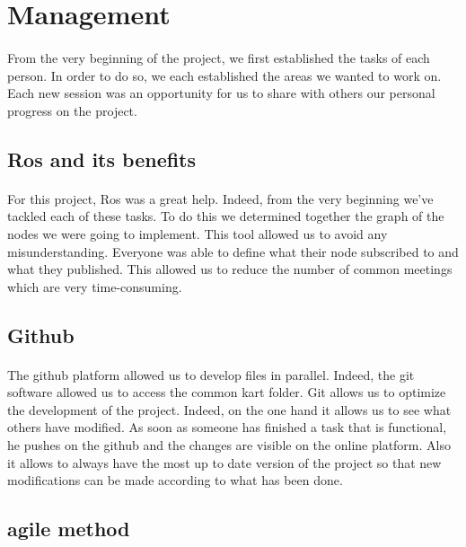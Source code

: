 
\section{Management}
\paragraph{}
From the very beginning of the project, we first established the tasks of each person. In order to do so, we each established the areas we wanted to work on.
Each new session was an opportunity for us to share with others our personal progress on the project.

\subsection{Ros and its benefits}
\paragraph{}
For this project, Ros was a great help. Indeed, from the very beginning we've tackled each of these tasks. 
To do this we determined together the graph of the nodes we were going to implement. 
This tool allowed us to avoid any misunderstanding. 
Everyone was able to define what their node subscribed to and what they published. 
This allowed us to reduce the number of common meetings which are very time-consuming.
\subsection{Github}
\paragraph{}
The github platform allowed us to develop files in parallel. 
Indeed, the git software allowed us to access the common kart folder. Git allows us to optimize the development of the project. 
Indeed, on the one hand it allows us to see what others have modified. 
As soon as someone has finished a task that is functional, he pushes on the github and the changes are visible on the online platform. 
Also it allows to always have the most up to date version of the project so that new modifications can be made according to what has been done.

\subsection{agile method}

